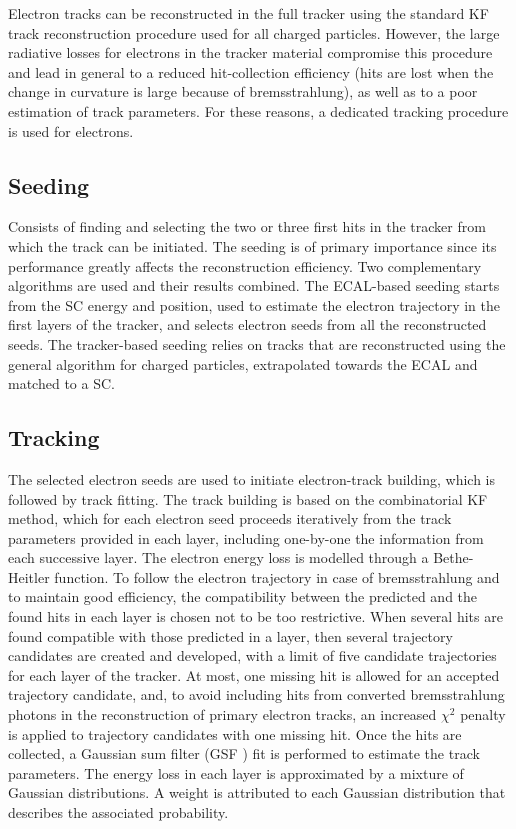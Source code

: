 Electron tracks can be reconstructed in the full tracker using the standard KF track reconstruction procedure used for all charged particles. However, the large radiative losses for electrons in the tracker material compromise this procedure and lead in general to a reduced hit-collection efficiency (hits are lost when the change in curvature is large because of bremsstrahlung), as well as to a poor estimation of track parameters. For these reasons, a dedicated tracking procedure is used for electrons.
\subsection{Seeding}
Consists of finding and selecting the two or three first hits in the tracker from which the track can be initiated. The seeding is of primary importance since its performance greatly affects the reconstruction efficiency. Two complementary algorithms are used and their results combined. The ECAL-based seeding starts from the SC energy and position, used to estimate the electron trajectory in the first layers of the tracker, and selects electron seeds from all the reconstructed seeds. The tracker-based seeding relies on tracks that are reconstructed using the general algorithm for charged particles, extrapolated towards the ECAL and matched to a SC. 
\subsection{Tracking}
The selected electron seeds are used to initiate electron-track building, which is followed by track fitting. The track building is based on the combinatorial KF method, which for each electron seed proceeds iteratively from the track parameters provided in each layer, including one-by-one the information from each successive layer. The electron energy loss is modelled through a Bethe-Heitler function. To follow the electron trajectory in case of bremsstrahlung and to maintain good efficiency, the compatibility between the predicted and the found hits in each layer is chosen not to be too restrictive. When several hits are found compatible with those predicted in a layer, then several trajectory candidates are created and developed, with a limit of five candidate trajectories for each layer of the tracker. At most, one missing hit is allowed for an accepted trajectory candidate, and, to avoid including hits from converted bremsstrahlung photons in the reconstruction of primary electron tracks, an increased $\chi^2$ penalty is applied to trajectory candidates with one missing hit. Once the hits are collected, a Gaussian sum filter (GSF \cite{GSF}) fit is performed to estimate the track parameters. The energy loss in each layer is approximated by a mixture of Gaussian distributions. A weight is attributed to each Gaussian distribution that describes the associated probability. 
